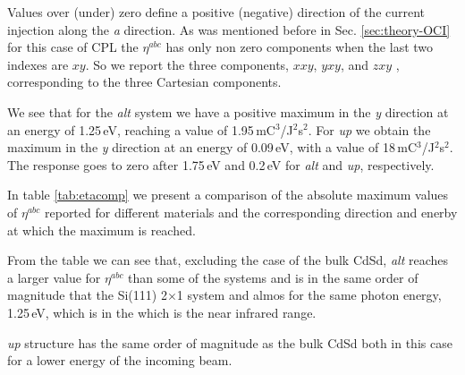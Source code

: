 \documentclass[pss]{wiley2sp} %
\begin{document}
Values over (under) zero define a positive (negative) direction of the current injection along the \emph{a} direction. As was mentioned before in Sec. \ref{sec:theory-OCI} for this case of CPL the $\eta^{abc}$ has only non zero components when the last two indexes are $xy$. So we report the three components, $xxy$, $yxy$, and $zxy$ , corresponding to the three Cartesian components.

We see that for the \emph{alt} system we have a positive maximum in the \emph{y} direction at an energy of 1.25\,eV, reaching a value of 1.95\,mC$^{3}$/J$^{2}$s$^{2}$. For \emph{up} we obtain the maximum in the \emph{y} direction at an energy of 0.09\,eV, with a value of 18\,mC$^{3}$/J$^{2}$s$^{2}$. The response goes to zero after 1.75\,eV and 0.2\,eV for \emph{alt} and \emph{up}, respectively.

In table \ref{tab:etacomp} we present a comparison of the absolute maximum values of $\eta^{abc}$ reported for different materials and the corresponding direction and enerby at which the maximum is reached. 

From the table we can see that, excluding the case of the bulk CdSd, \emph{alt} reaches a larger value for $\eta^{abc}$ than some of the systems and is in the same order of magnitude that the Si(111) 2$\times$1 system and almos for the same photon energy, 1.25\,eV, which is in the which is the near infrared range. 

\emph{up} structure has the same order of magnitude as the bulk CdSd both in this case for a lower energy of the incoming beam.\

\end{document}
